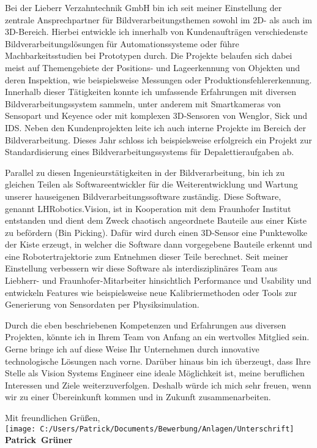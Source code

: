 \documentclass[10pt,a4paper]{article}
\def\firstname{Patrick}
\def\familyname{Grüner}
\begin{document}
Bei der Lieberr Verzahntechnik GmbH bin ich seit meiner Einstellung der zentrale Ansprechpartner für Bildverarbeitungsthemen sowohl im 2D- als auch im 3D-Bereich. Hierbei entwickle ich innerhalb von Kundenaufträgen verschiedenste Bildverarbeitungslösungen für Automationssysteme oder führe Machbarkeitsstudien bei Prototypen durch. Die Projekte belaufen sich dabei meist auf Themengebiete der Positions- und Lageerkennung von Objekten und deren Inspektion, wie beispielsweise Messungen oder Produktionsfehlererkennung. Innerhalb dieser Tätigkeiten konnte ich umfassende Erfahrungen mit diversen Bildverarbeitungssystem sammeln, unter anderem mit Smartkameras von Sensopart und Keyence oder mit komplexen 3D-Sensoren von Wenglor, Sick und IDS. Neben den Kundenprojekten leite ich auch interne Projekte im Bereich der Bildverarbeitung. Dieses Jahr schloss ich beispielsweise erfolgreich ein Projekt zur Standardisierung eines Bildverarbeitungssystems für Depalettieraufgaben ab.

Parallel zu diesen Ingenieurstätigkeiten in der Bildverarbeitung, bin ich zu gleichen Teilen als Softwareentwickler für die Weiterentwicklung und Wartung unserer hauseigenen Bildverarbeitungssoftware zuständig. Diese Software, genannt \glqq LHRobotics.Vision\grqq, ist in Kooperation mit dem Fraunhofer Institut entstanden und dient dem Zweck chaotisch angeordnete Bauteile aus einer Kiste zu befördern (\glqq Bin Picking\grqq). Dafür wird durch einen 3D-Sensor eine Punktewolke der Kiste erzeugt, in welcher die Software dann vorgegebene Bauteile erkennt und eine Robotertrajektorie zum Entnehmen dieser Teile berechnet. Seit meiner Einstellung verbessern wir diese Software als interdisziplinäres Team aus Liebherr- und Fraunhofer-Mitarbeiter hinsichtlich Performance und Usability und entwickeln Features wie beispielsweise neue Kalibriermethoden oder Tools zur Generierung von Sensordaten per Physiksimulation.

Durch die eben beschriebenen Kompetenzen und Erfahrungen aus diversen Projekten, könnte ich in Ihrem Team von Anfang an ein wertvolles Mitglied sein. Gerne bringe ich auf diese Weise Ihr Unternehmen durch innovative technologische Lösungen nach vorne. Darüber hinaus bin ich überzeugt, dass Ihre Stelle als Vision Systems Engineer eine ideale Möglichkeit ist, meine beruflichen Interessen und Ziele weiterzuverfolgen. Deshalb würde ich mich sehr freuen, wenn wir zu einer Übereinkunft kommen und in Zukunft zusammenarbeiten.

Mit freundlichen Grüßen,\\[3em]

\texttt{[image: C:/Users/Patrick/Documents/Bewerbung/Anlagen/Unterschrift]}\\
{\bfseries \firstname~\familyname}\\
%
\vfill%
\end{document}
